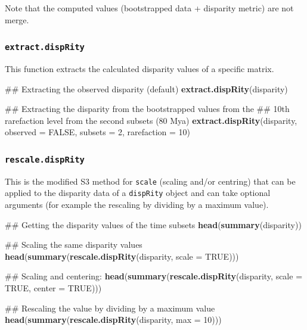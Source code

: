 \documentclass[]{book}
\newenvironment{Shaded}{\begin{snugshade}}{\end{snugshade}}
\newcommand{\KeywordTok}[1]{\textcolor[rgb]{0.13,0.29,0.53}{\textbf{#1}}}
\newcommand{\DataTypeTok}[1]{\textcolor[rgb]{0.13,0.29,0.53}{#1}}
\newcommand{\DecValTok}[1]{\textcolor[rgb]{0.00,0.00,0.81}{#1}}
\newcommand{\OtherTok}[1]{\textcolor[rgb]{0.56,0.35,0.01}{#1}}
\newcommand{\NormalTok}[1]{#1}
\theoremstyle{definition}
\theoremstyle{definition}
\theoremstyle{definition}
\theoremstyle{remark}
\begin{document}
Note that the computed values (bootstrapped data + disparity metric) are
not merge.

\subsubsection{\texorpdfstring{\texttt{extract.dispRity}}{extract.dispRity}}\label{extract.disprity}

This function extracts the calculated disparity values of a specific
matrix.

\begin{Shaded}
\begin{Highlighting}[]
\NormalTok{## Extracting the observed disparity (default)}
\KeywordTok{extract.dispRity}\NormalTok{(disparity)}

\NormalTok{## Extracting the disparity from the bootstrapped values from the}
\NormalTok{## 10th rarefaction level from the second subsets (80 Mya)}
\KeywordTok{extract.dispRity}\NormalTok{(disparity, }\DataTypeTok{observed =} \OtherTok{FALSE}\NormalTok{, }\DataTypeTok{subsets =} \DecValTok{2}\NormalTok{, }\DataTypeTok{rarefaction =} \DecValTok{10}\NormalTok{)}
\end{Highlighting}
\end{Shaded}

\subsubsection{\texorpdfstring{\texttt{rescale.dispRity}}{rescale.dispRity}}\label{rescale.disprity}

This is the modified S3 method for \texttt{scale} (scaling and/or
centring) that can be applied to the disparity data of a
\texttt{dispRity} object and can take optional arguments (for example
the rescaling by dividing by a maximum value).

\begin{Shaded}
\begin{Highlighting}[]
\NormalTok{## Getting the disparity values of the time subsets}
\KeywordTok{head}\NormalTok{(}\KeywordTok{summary}\NormalTok{(disparity))}

\NormalTok{## Scaling the same disparity values}
\KeywordTok{head}\NormalTok{(}\KeywordTok{summary}\NormalTok{(}\KeywordTok{rescale.dispRity}\NormalTok{(disparity, }\DataTypeTok{scale =} \OtherTok{TRUE}\NormalTok{)))}

\NormalTok{## Scaling and centering:}
\KeywordTok{head}\NormalTok{(}\KeywordTok{summary}\NormalTok{(}\KeywordTok{rescale.dispRity}\NormalTok{(disparity, }\DataTypeTok{scale =} \OtherTok{TRUE}\NormalTok{, }\DataTypeTok{center =} \OtherTok{TRUE}\NormalTok{)))}

\NormalTok{## Rescaling the value by dividing by a maximum value}
\KeywordTok{head}\NormalTok{(}\KeywordTok{summary}\NormalTok{(}\KeywordTok{rescale.dispRity}\NormalTok{(disparity, }\DataTypeTok{max =} \DecValTok{10}\NormalTok{)))}
\end{Highlighting}
\end{Shaded}
\end{document}
